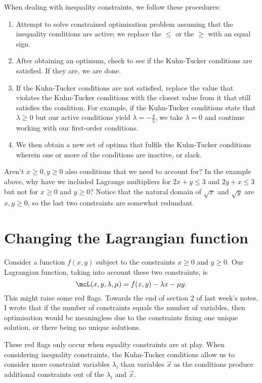 \documentclass[a4paper, 12pt,oneside,openany]{book}
\begin{document}
When dealing with inequality constraints, we follow these procedures:
\begin{enumerate}
	\item Attempt to solve constrained optimisation problem assuming that the inequality conditions are active; we replace the $\leq$ or the $\geq$ with an equal sign.
	\item After obtaining an optimum, check to see if the Kuhn-Tucker conditions are satisfied. If they are, we are done.
	\item If the Kuhn-Tucker conditions are not satisfied, replace the value that violates the Kuhn-Tucker conditions with the closest value from it that still satisfies the condition. For example, if the Kuhn-Tucker conditions state that $\lambda \geq0$ but our active conditions yield $\lambda = -\frac{4}{5}$, we take $\lambda=0$ and continue working with our first-order conditions. 
	\item We then obtain a new set of optima that fulfils the Kuhn-Tucker conditions wherein one or more of the conditions are inactive, or slack.
\end{enumerate}

Aren't $x\geq 0, y\geq 0$ also conditions that we need to account for? In the example above, why have we included Lagrange multipliers for $2x+y\leq 3$ and $2y+x\leq 3$ but not for $x\geq0$ and $y\geq0$? Notice that the natural domain of $\sqrt{x}$ and $\sqrt{y}$ are $x, y\geq0$, so the last two constraints are somewhat redundant. 

\section{Changing the Lagrangian function}

Consider a function $f(x,y)$ subject to the constraints $x\geq0$ and $y\geq0$. Our Lagrangian function, taking into account these two constraints, is $$\mcL(x, y, \lambda, \mu) = f(x, y )-\lambda x - \mu y.$$ This might raise some red flags. Towards the end of section 2 of last week's notes, I wrote that if the number of constraints equals the number of variables, then optimisation would be meaningless due to the constraints fixing one unique solution, or there being no unique solutions. 

These red flags only occur when equality constraints are at play. When considering inequality constraints, the Kuhn-Tucker conditions allow us to consider more constraint variables $\lambda_i$ than variables $\vec{x}$ as the conditions produce additional constraints out of the $\lambda_i$ and $\vec{x}$.
\end{document}
